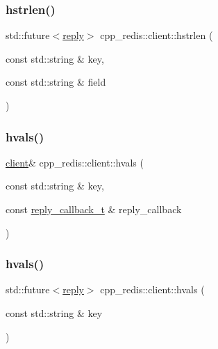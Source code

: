 \subsubsection{\texorpdfstring{hstrlen()}{hstrlen()}\hspace{0.1cm}{\footnotesize\ttfamily [2/2]}}
{\footnotesize\ttfamily std\+::future$<$\hyperlink{classcpp__redis_1_1reply}{reply}$>$ cpp\+\_\+redis\+::client\+::hstrlen (\begin{DoxyParamCaption}\item[{const std\+::string \&}]{key,  }\item[{const std\+::string \&}]{field }\end{DoxyParamCaption})}

\mbox{\label{classcpp__redis_1_1client_af74a8adbcd6f21178b43f3f2edddb472}} 
\subsubsection{\texorpdfstring{hvals()}{hvals()}\hspace{0.1cm}{\footnotesize\ttfamily [1/2]}}
{\footnotesize\ttfamily \hyperlink{classcpp__redis_1_1client}{client}\& cpp\+\_\+redis\+::client\+::hvals (\begin{DoxyParamCaption}\item[{const std\+::string \&}]{key,  }\item[{const \hyperlink{classcpp__redis_1_1client_a061a1140d36d2eaeda82b09a0bb3f9f2}{reply\+\_\+callback\+\_\+t} \&}]{reply\+\_\+callback }\end{DoxyParamCaption})}

\mbox{\label{classcpp__redis_1_1client_af391940cf5b996a0682e881da446b7da}} 
\subsubsection{\texorpdfstring{hvals()}{hvals()}\hspace{0.1cm}{\footnotesize\ttfamily [2/2]}}
{\footnotesize\ttfamily std\+::future$<$\hyperlink{classcpp__redis_1_1reply}{reply}$>$ cpp\+\_\+redis\+::client\+::hvals (\begin{DoxyParamCaption}\item[{const std\+::string \&}]{key }\end{DoxyParamCaption})}

